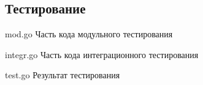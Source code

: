 

\begin{appendices}
	\chapter{Тестирование}

{mod.go}
{Часть кода модульного тестирования}

{integr.go}
{Часть кода интеграционного тестирования}

{test.go}
{Результат тестирования}


%
%
%
%
%

\end{appendices}

